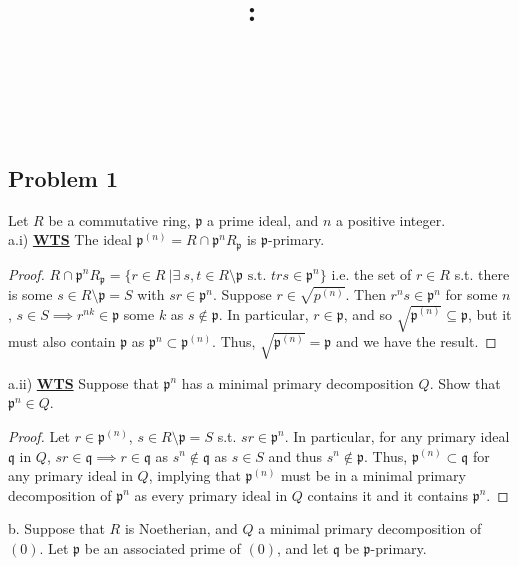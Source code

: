 \documentclass{article}
\title{
    \vspace{2in}
    \textmd{\textbf{\hmwkClass:\ \hmwkTitle}}\\
    \vspace{0.1in}
    \textmd{\hmwkDueDate} \\
    \vspace{0.2in}\large{\textit{\hmwkClassInstructor\  }}
    \vspace{2in}
}
\author{\hmwkAuthorName}
\date{}
\newcommand{\fk}[1]{\mathfrak{#1}}
\begin{document}
\maketitle
\newpage
\subsection*{Problem 1}

Let $R$ be a commutative ring, $\fk{p}$ a prime ideal, and $n$ a positive integer. \\

a.i) \textbf{\underline{WTS}} The ideal $\fk{p}^{(n)} = R \cap \fk{p}^{n}R_{\fk{p}}$ is $\fk{p}$-primary.
\begin{proof}
  $R \cap \fk{p}^{n}R_{\fk{p}}  = \{r \in R \ | \exists \ s,t \in R\setminus\fk{p} \text{ s.t. } trs \in \fk{p}^{n}\}$ i.e. the set of $r \in R$ s.t. there is some $s \in R \setminus \fk{p} = S$ with $sr \in \fk{p}^{n}$. Suppose $r \in \sqrt{p^{(n)}}$. Then $r^{n}s \in\fk{p}^{n}$ for some $n$, $s \in S \implies r^{nk} \in \fk{p}$ some $k$ as $s \notin\fk{p}$. In particular, $r \in \fk{p}$, and so $\sqrt{\fk{p}^{(n)}} \subseteq \fk{p}$, but it must also contain $\fk{p}$ as $\fk{p}^{n} \subset \fk{p}^{(n)}$. Thus, $\sqrt{\fk{p}^{(n)}} = \fk{p}$ and we have the result.
\end{proof}

a.ii) \textbf{\underline{WTS}} Suppose that $\fk{p}^{n}$ has a minimal primary decomposition $Q$. Show that $\fk{p}^{n}\in Q$.
\begin{proof}
  Let $r \in \fk{p}^{(n)}$, $s \in R \setminus \fk{p} = S$ s.t. $sr \in \fk{p}^{n}$. In particular, for any primary ideal $\fk{q}$ in $Q$, $sr \in \fk{q} \implies r \in \fk{q}$ as $s^{n} \notin \fk{q}$ as $s \in S$ and thus $s^{n} \notin \fk{p}$. Thus, $\fk{p}^{(n)} \subset \fk{q}$ for any primary ideal in $Q$, implying that $\fk{p}^{(n)}$ must be in a minimal primary decomposition of $\fk{p}^{n}$ as every primary ideal in $Q$ contains it and it contains $\fk{p}^{n}$.
\end{proof}

b. Suppose that $R$ is Noetherian, and $Q$ a minimal primary decomposition of $(0)$. Let $\fk{p}$ be an associated prime of $(0)$, and let $\fk{q}$ be $\fk{p}$-primary. \\
\end{document}
